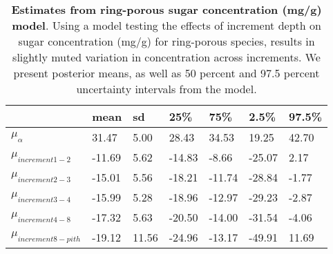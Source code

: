 \documentclass{article}\usepackage[]{graphicx}\usepackage[]{color}
\begin{document}
\begin{table}[ht]
\centering
\caption{\textbf{Estimates from ring-porous sugar concentration (mg/g) model}. Using a model testing the effects of increment depth on sugar concentration (mg/g) for ring-porous species, results in slightly muted variation in concentration across increments. We present posterior means, as well as 50 percent and 97.5 percent uncertainty intervals from the model.} 
\label{tab:ringsug}
\begingroup\footnotesize
\begin{tabular}{|p{}|p{}|p{}|p{}|p{}|p{}|p{}|}
  \hline
 & mean & sd & 25\% & 75\% & 2.5\% & 97.5\% \\ 
  \hline
$\mu_{\alpha}$ & 31.47 & 5.00 & 28.43 & 34.53 & 19.25 & 42.70 \\ 
  $\mu_{increment 1-2}$ & -11.69 & 5.62 & -14.83 & -8.66 & -25.07 & 2.17 \\ 
  $\mu_{increment 2-3}$ & -15.01 & 5.56 & -18.21 & -11.74 & -28.84 & -1.77 \\ 
  $\mu_{increment 3-4}$ & -15.99 & 5.28 & -18.96 & -12.97 & -29.23 & -2.87 \\ 
  $\mu_{increment 4-8}$ & -17.32 & 5.63 & -20.50 & -14.00 & -31.54 & -4.06 \\ 
  $\mu_{increment 8-pith}$ & -19.12 & 11.56 & -24.96 & -13.17 & -49.91 & 11.69 \\ 
   \hline
\end{tabular}
\endgroup
\end{table}
\end{document}
